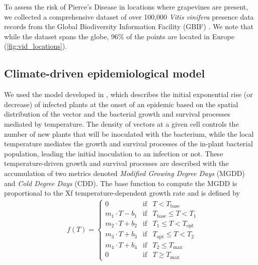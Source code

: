 To assess the risk of Pierce's Disease in locations where grapevines are
present, we collected a comprehensive dataset of over 100,000 \textit{Vitis
    vinifera} presence data records from the Global Biodiversity Information
Facility (GBIF) \cite{noauthor_what_nodate,GBIF}. We note that while the
dataset spans the globe, 96\% of the points are located in Europe
(\cref{fig:vid_locations}).

\subsection{Climate-driven epidemiological model}

We used the model developed in \cite{GimenezRomero2022_CommsBio}, which
describes
the initial exponential rise (or decrease) of infected plants at the onset of
an epidemic based on the spatial distribution of the vector and the bacterial
growth and survival processes mediated by temperature. The density of vectors
at a given cell controls the number of new plants that will be inoculated with
the bacterium, while the local temperature mediates the growth and survival
processes of the in-plant bacterial population, leading the initial inoculation
to an infection or not. These temperature-driven growth and survival processes
are described with the accumulation of two metrics denoted \textit{Modified
    Growing Degree Days} (MGDD) and \textit{Cold Degree Days} (CDD). The base
function to compute the MGDD is proportional to the Xf temperature-dependent
growth rate and is defined by
\begin{align*}
     & f(T)=\left\{\begin{array}{lll}
                       0                & \textrm{if} & T<T_{\textrm{base}}
                       \\
                       m_1\cdot T-b_1   & \textrm{if} & T_{\textrm{base}} \leq
                       T < T_1
                       \\
                       m_2\cdot T + b_2 & \textrm{if} & T_{1} \leq T <
                       T_{\textrm{opt}}
                       \\
                       m_3\cdot T + b_3 & \textrm{if} & T_{\textrm{opt}}
                       \leq T
                       < T_2
                       \\
                       m_4\cdot T + b_4 & \textrm{if} & T_2 \leq
                       T_{\textrm{max}}
                       \\
                       0                & \textrm{if} & T\geq T_{\textrm{max}}
                   \end{array}\right. \,
\end{align*}
